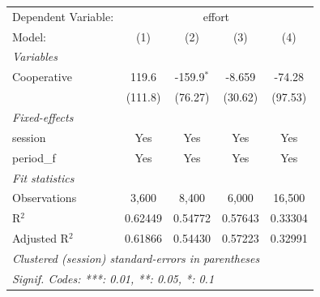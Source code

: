 
\begingroup
\centering
\begin{tabular}{lcccc}
   \tabularnewline \midrule \midrule
   Dependent Variable: & \multicolumn{4}{c}{effort}\\
   Model:         & (1)     & (2)          & (3)     & (4)\\  
   \midrule
   \emph{Variables}\\
   Cooperative    & 119.6   & -159.9$^{*}$ & -8.659  & -74.28\\   
                  & (111.8) & (76.27)      & (30.62) & (97.53)\\   
   \midrule
   \emph{Fixed-effects}\\
   session        & Yes     & Yes          & Yes     & Yes\\  
   period\_f      & Yes     & Yes          & Yes     & Yes\\  
   \midrule
   \emph{Fit statistics}\\
   Observations   & 3,600   & 8,400        & 6,000   & 16,500\\  
   R$^2$          & 0.62449 & 0.54772      & 0.57643 & 0.33304\\  
   Adjusted R$^2$ & 0.61866 & 0.54430      & 0.57223 & 0.32991\\  
   \midrule \midrule
   \multicolumn{5}{l}{\emph{Clustered (session) standard-errors in parentheses}}\\
   \multicolumn{5}{l}{\emph{Signif. Codes: ***: 0.01, **: 0.05, *: 0.1}}\\
\end{tabular}
\par\endgroup


